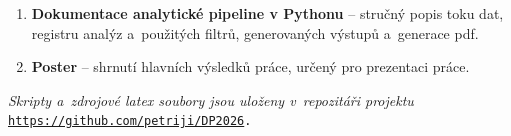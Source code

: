 \begin{enumerate}[leftmargin=*]
	\item \textbf{Dokumentace analytické pipeline v Pythonu} -- stručný popis toku dat, registru analýz a~použitých filtrů, generovaných výstupů a~generace pdf.
	\item \textbf{Poster} -- shrnutí hlavních výsledků práce, určený pro prezentaci práce.
\end{enumerate}

\noindent
\textit{Skripty a~zdrojové latex soubory jsou uloženy v~repozitáři projektu}\newline
\texttt{\url{https://github.com/petriji/DP2026}.}
